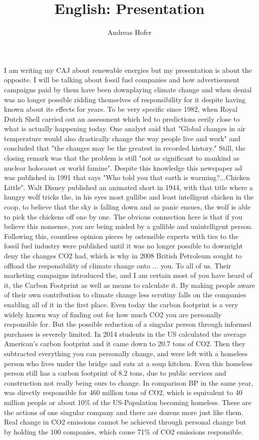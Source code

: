 \documentclass{article}
\title{English: Presentation}
\author{Andreas Hofer}
\begin{document}
	\maketitle
	\large
I am writing my CAJ about renewable energies but my presentation is about the opposite. I will be talking about fossil fuel companies and how advertisement campaigns paid by them have been downplaying climate change and when denial was no longer possible ridding themselves of responsibility for it despite having known about its effects for years. To be very specific since 1982, when Royal Dutch Shell carried out an assessment which led to predictions eerily close to what is actually happening today. One analyst said that "Global changes in air temperature would also drastically change the way people live and work" and concluded that "the changes may be the greatest in recorded history." Still, the closing remark was that the problem is still "not as significant to mankind as nuclear holocaust or world famine". Despite this knowledge this newspaper ad was published in 1991 that says "Who told you that earth is warming?...Chicken Little". Walt Disney published an animated short in 1944, with that title where a hungry wolf tricks the, in his eyes most gullibe and least intelligent chicken in the coop, to believe that the sky is falling down and as panic ensues, the wolf is able to pick the chickens off one by one. The obvious connection here is that if you believe this nonsense, you are being misled by a gullible and unintelligent person. Following this, countless opinion pieces by ostensible experts with ties to the fossil fuel industry were published until it was no longer possible to downright deny the changes CO2 had, which is why in 2008 British Petroleum sought to offload the responsibility of climate change onto ... you. To all of us. Their marketing campaigns introduced the, and I am certain most of you have heard of it, the Carbon Footprint as well as means to calculate it. By making people aware of their own contribution to climate change less scrutiny falls on the companies enabling all of it in the first place. Even today the carbon footprint is a very widely known way of finding out for how much CO2 you are personally responsible for. But the possible reduction of a singular person through informed purchases is severely limited. In 2014 students in the US calculated the average American's carbon footprint and it came down to 20.7 tons of CO2. Then they subtracted everything you can personally change, and were left with a homeless person who lives under the bridge and eats at a soup kitchen. Even this homeless person still has a carbon footprint of 8.2 tons, due to public services and construction not really being ours to change. In comparison BP in the same year, was directly responsible for 460 million tons of CO2, which is equivalent to 40 million people or about 10\% of the US-Population becoming homeless. These are the actions of one singular company and there are dozens more just like them. Real change in CO2 emissions cannot be achieved through personal change but by holding the 100 companies, which cause 71\% of CO2 emissions responsible.
\end{document}
